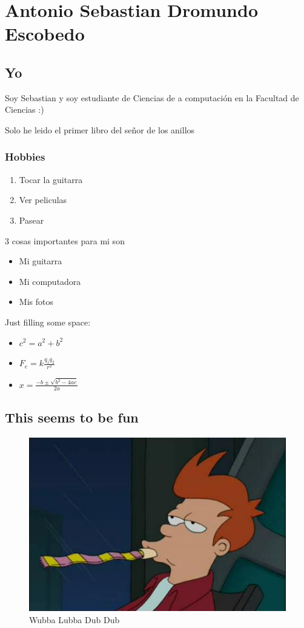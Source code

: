 \chapter{Antonio Sebastian Dromundo Escobedo}

\section{Yo}
Soy Sebastian y soy estudiante de Ciencias de a computación en la Facultad de Ciencias :)

Solo he leido el primer libro del señor de los anillos ~\cite{comunidad}

\subsection{Hobbies}
\begin{enumerate}
\item Tocar la guitarra
\item Ver peliculas
\item Pasear
\end{enumerate}

3 cosas importantes para mi son

\begin{itemize}
\item Mi guitarra
\item Mi computadora
\item Mis fotos
\end{itemize}

\newpage
Just filling some space:
\begin{itemize}
\item $c^2 = a^2 + b^2$
\item $F_{e} = k \frac{q_{1} q_{2}}{r^2}$
\item $x= \frac{-b \pm \sqrt{b^2-4ac}}{2a}$
\end{itemize}

\section{This seems to be fun}
\begin{figure}[h]
  \centering
  \includegraphics[scale=0.5]{IMG/Fry.jpg}
  \caption{Wubba Lubba Dub Dub}
  \label{fig:fry}
\end{figure}

